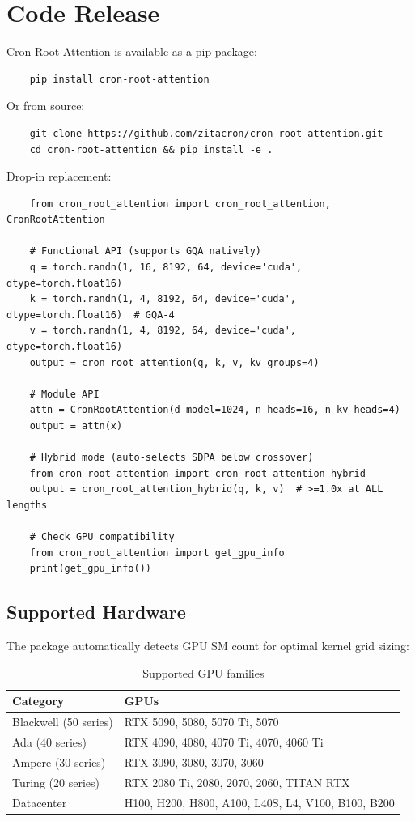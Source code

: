 \documentclass{article}
\begin{document}
    \section{Code Release}
    \label{sec:code}

    Cron Root Attention is available as a pip package:

    \begin{verbatim}
    pip install cron-root-attention
    \end{verbatim}

    Or from source:
    \begin{verbatim}
    git clone https://github.com/zitacron/cron-root-attention.git
    cd cron-root-attention && pip install -e .
    \end{verbatim}

    Drop-in replacement:
    \begin{verbatim}
    from cron_root_attention import cron_root_attention, CronRootAttention

    # Functional API (supports GQA natively)
    q = torch.randn(1, 16, 8192, 64, device='cuda', dtype=torch.float16)
    k = torch.randn(1, 4, 8192, 64, device='cuda', dtype=torch.float16)  # GQA-4
    v = torch.randn(1, 4, 8192, 64, device='cuda', dtype=torch.float16)
    output = cron_root_attention(q, k, v, kv_groups=4)

    # Module API
    attn = CronRootAttention(d_model=1024, n_heads=16, n_kv_heads=4)
    output = attn(x)

    # Hybrid mode (auto-selects SDPA below crossover)
    from cron_root_attention import cron_root_attention_hybrid
    output = cron_root_attention_hybrid(q, k, v)  # >=1.0x at ALL lengths

    # Check GPU compatibility
    from cron_root_attention import get_gpu_info
    print(get_gpu_info())
    \end{verbatim}

    \subsection{Supported Hardware}

    The package automatically detects GPU SM count for optimal kernel grid sizing:

    \begin{table}[h]
    \centering
    \caption{Supported GPU families}
    \begin{tabular}{ll}
    \toprule
    Category & GPUs \\
    \midrule
    Blackwell (50 series) & RTX 5090, 5080, 5070 Ti, 5070 \\
    Ada (40 series) & RTX 4090, 4080, 4070 Ti, 4070, 4060 Ti \\
    Ampere (30 series) & RTX 3090, 3080, 3070, 3060 \\
    Turing (20 series) & RTX 2080 Ti, 2080, 2070, 2060, TITAN RTX \\
    Datacenter & H100, H200, H800, A100, L40S, L4, V100, B100, B200 \\
    \bottomrule
    \end{tabular}
    \end{table}
\end{document}
